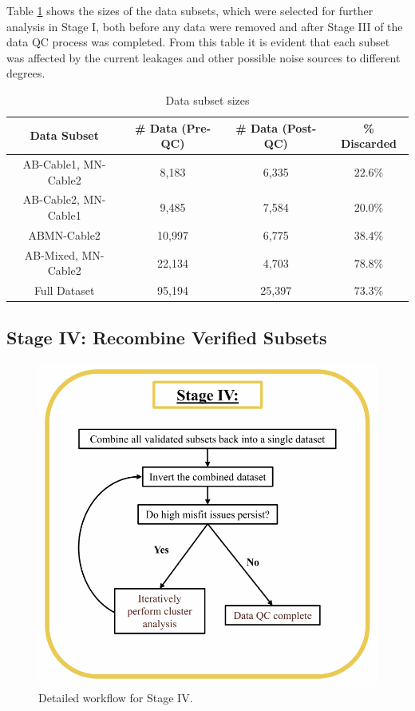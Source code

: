 \documentclass[final,authoryear,5p,times,twocolumn]{elsarticle}
\begin{document}
Table \ref{tab:DataSubsetSizes} shows the sizes of the data subsets, which were selected for further analysis in Stage I, both before any data were removed and after Stage III of the data QC process was completed. From this table it is evident that each subset was affected by the current leakages and other possible noise sources to different degrees.

\begin{table}[!ht]
\scriptsize
\begin{center}
  \begin{tabular}{| c | c | c | c |}
    \hline
    \bf{Data Subset} & \bf{\# Data (Pre-QC)} & \bf{\# Data (Post-QC)} & \bf{\% Discarded} \\
    \hline
    AB-Cable1, MN-Cable2 & 8,183 & 6,335 & $22.6 \%$ \\
    \hline
    AB-Cable2, MN-Cable1 & 9,485 & 7,584 & $20.0 \%$\\
    \hline
    ABMN-Cable2 & 10,997 & 6,775 & $38.4 \%$\\
    \hline
    AB-Mixed, MN-Cable2  & 22,134 & 4,703 & $78.8 \%$\\
    \hline
    Full Dataset  & 95,194 & 25,397 & $73.3 \%$\\
    \hline    
  \end{tabular}
\caption{Data subset sizes}
\label{tab:DataSubsetSizes}
\end{center}
\end{table}

\subsection{Stage IV: Recombine Verified Subsets}
\label{Data_Quality_Control:StageIV_Recombine_Subsets}

\begin{figure} [!ht]
\begin{center}
   \includegraphics[trim=0cm 0cm 0cm 0cm, clip=true,width=0.75\linewidth]{./Figures/Fig16.pdf}     
\end{center}
\caption{Detailed workflow for Stage IV.}
\label{fig:DataQC_workflow_StageIV}
\end{figure}
\end{document}
